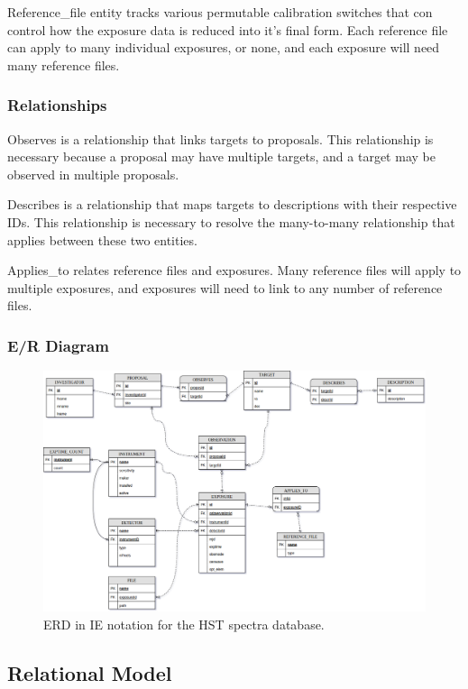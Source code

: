 \documentclass[a4paper,11pt]{article}
\begin{document}
Reference\_file entity tracks various permutable calibration switches that con control how the exposure data is reduced into it's final form.  Each reference file can apply to many individual exposures, or none, and each exposure will need many reference files.  

\subsubsection{Relationships}
Observes is a relationship that links targets to proposals.  This relationship is necessary because a proposal may have multiple targets, and a target may be observed in multiple proposals.  

Describes is a relationship that maps targets to descriptions with their respective IDs.  This relationship is necessary to resolve the many-to-many relationship that applies between these two entities.  

Applies\_to relates reference files and exposures.  Many reference files will apply to multiple exposures, and exposures will need to link to any number of reference files.  

\subsubsection{E/R Diagram}

\begin{figure}[h!]
\caption{ERD in IE notation for the HST spectra database.}
\centering
\includegraphics[width=.9\textwidth]{hst_spectra_erd.png}
\end{figure}

\subsection{Relational Model}
\end{document}
